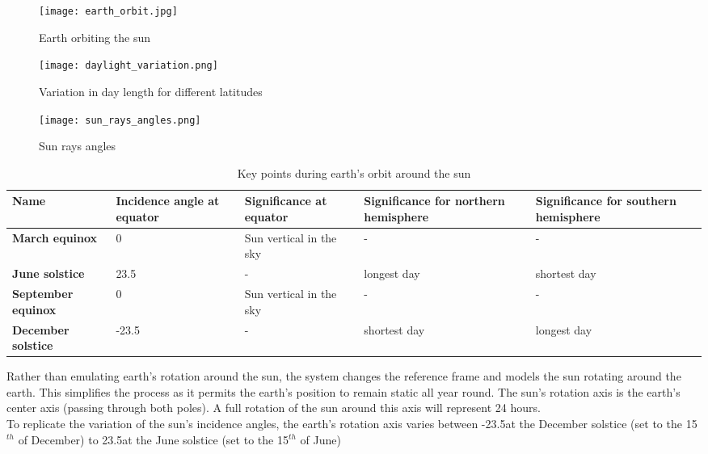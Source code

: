 \begin{figure}[!h]
\center
	\label{fig:earth_orbit}
	\texttt{[image: earth\_orbit.jpg]}
	\caption{ Earth orbiting the sun \protect\footnotemark}
\end{figure}

\begin{figure}[!h]
\center
	\label{fig:daylight_variation}
	\texttt{[image: daylight\_variation.png]}
	\caption{ Variation in day length for different latitudes \protect\footnotemark}
\end{figure}

\begin{figure}[!h]
\center
	\label{fig:sun_rays}
	\texttt{[image: sun\_rays\_angles.png]}
	\caption{ Sun rays angles \protect\footnotemark}
\end{figure}


\begin{table}[h]
  \centering
	  \label{tab:equinox_and_solstices}
	    \begin{tabular}{|p{3cm}|p{3cm}|p{3cm}|p{3cm}|p{3cm}|}
  	    \hline	
  	    \textbf{Name} & \textbf{Incidence angle at equator} & \textbf{Significance at equator} & \textbf{Significance for northern hemisphere} & \textbf{Significance for southern hemisphere} \\
		\hline
		\textbf{March equinox} & 0\textdegree & Sun vertical in the sky & - & - \\
		\hline
		\textbf{June solstice} & 23.5\textdegree & - &  longest day & shortest day \\
		\hline
		\textbf{September equinox} & 0\textdegree &  Sun vertical in the sky & - & - \\
		\hline
		\textbf{December solstice} & -23.5\textdegree & - & shortest day & longest day \\
		\hline
		\end{tabular}
		\caption{Key points during earth's orbit around the sun}
\end{table}

Rather than emulating earth's rotation around the sun, the system changes the reference frame and models the sun rotating around the earth. This simplifies the process as it permits the earth's position to remain static all year round. The sun's rotation axis is the earth's center axis (passing through both poles). A full rotation of the sun around this axis will represent 24 hours.\\
To replicate the variation of the sun's incidence angles, the earth's rotation axis varies between -23.5\textdegree at the December solstice (set to the 15$^{th}$ of December) to 23.5\textdegree at the June solstice (set to the 15$^{th}$ of June)
